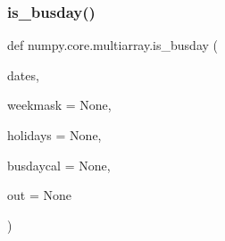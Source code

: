  \mbox{\label{namespacenumpy_1_1core_1_1multiarray_a51bb1d46fa467937b809e5b19ed0a568}} 
\subsubsection{\texorpdfstring{is\+\_\+busday()}{is\_busday()}}
{\footnotesize\ttfamily def numpy.\+core.\+multiarray.\+is\+\_\+busday (\begin{DoxyParamCaption}\item[{}]{dates,  }\item[{}]{weekmask = {\ttfamily None},  }\item[{}]{holidays = {\ttfamily None},  }\item[{}]{busdaycal = {\ttfamily None},  }\item[{}]{out = {\ttfamily None} }\end{DoxyParamCaption})}

